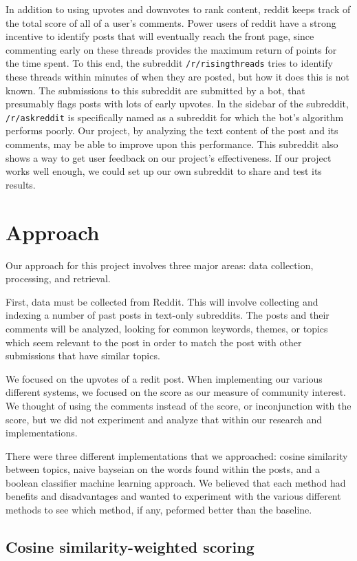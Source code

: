 \documentclass{acm_proc_article-sp}
\begin{document}
In addition to using upvotes and downvotes to rank content, reddit keeps track
of the total score of all of a user's comments. Power users of reddit have a
strong incentive to identify posts that will eventually reach the front page,
since commenting early on these threads provides the maximum return of points
for the time spent. To this end, the subreddit \texttt{/r/risingthreads} tries
to identify these threads within minutes of when they are posted, but how it
does this is not known. The submissions to this subreddit are submitted by a
bot, that presumably flags posts with lots of early upvotes. In the sidebar of
the subreddit, \texttt{/r/askreddit} is specifically named as a subreddit for
which the bot's algorithm performs poorly. Our project, by analyzing the text
content of the post and its comments, may be able to improve upon this
performance. This subreddit also shows a way to get user feedback on our
project's effectiveness. If our project works well enough, we could set up our
own subreddit to share and test its results.

\section{Approach}
Our approach for this project involves three major areas: data collection, processing, and retrieval.

First, data must be collected from Reddit.  This will involve collecting and indexing a number of past posts
in text-only subreddits.  The posts and their comments will be analyzed, looking for common keywords,
themes, or topics which seem relevant to the post in order to match the post with other submissions
that have similar topics.

We focused on the upvotes of a redit post. When implementing our various different systems, we focused on the score as our measure of community interest. We thought of using the comments instead of the score, or inconjunction with the score, but we did not experiment and analyze that within our research and implementations.

There were three different implementations that we approached: cosine similarity between topics, naive bayseian on the words found within the posts, and a boolean classifier machine learning approach. We believed that each method had benefits and disadvantages and wanted to experiment with the various different methods to see which method, if any, peformed better than the baseline.

\subsection{Cosine similarity-weighted scoring}
\end{document}
